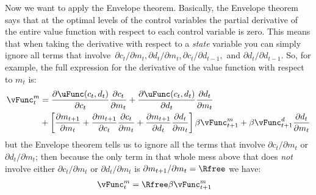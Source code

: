 \documentclass{handout}
\begin{document}
Now we want to apply the Envelope theorem.  Basically, the Envelope 
theorem says that at the optimal levels of the control variables the 
partial derivative of the entire value function with respect to each 
control variable is zero.  This means that when taking the derivative 
with respect to a {\it state} variable you can simply ignore all terms 
that involve~$\partial c_{t}/ \partial {m}_{t}, \partial d_{t} / 
\partial {m}_{t}, \partial c_{t} / \partial d_{t-1}, $ and $\partial 
d_{t} / \partial d_{t-1}.$ So, for example, the full expression for 
the derivative of the value function with respect to ${m}_{t}$ is:
\begin{equation}\begin{gathered}\begin{aligned}
        \vFunc_{t}^{{m}} & =  \frac{\partial \uFunc(c_{t},d_{t})}{\partial c_{t}}
                        \frac{\partial c_{t}}{\partial {m}_{t}}
                  + \frac{\partial \uFunc(c_{t},d_{t})}{\partial d_{t}}
                        \frac{\partial d_{t}}{\partial {m}_{t}} \nonumber \\
              &  + \left[\frac{\partial {m}_{t+1}}{\partial {m}_{t}}
                  +       \frac{\partial {m}_{t+1}}{\partial c_{t}}
                              \frac{\partial c_{t}}{\partial {m}_{t}}
                  +       \frac{\partial {m}_{t+1}}{\partial d_{t}}
                              \frac{\partial d_{t}}{\partial {m}_{t}} 
                        \right] \beta \vFunc^{{m}}_{t+1} + \beta 
                              \vFunc^{d}_{t+1} \frac{\partial d_{t}}{\partial 
                              {m}_{t}} \label{eq:vmt}
\end{aligned}\end{gathered}\end{equation}
but the Envelope theorem tells us to ignore all the terms that involve 
$\partial c_{t}/\partial {m}_{t}$ or $\partial d_{t}/\partial {m}_{t}$; 
then because the only term in that whole mess above that does {\it 
not} involve either $\partial c_{t}/\partial {m}_{t}$ or $\partial 
d_{t}/\partial {m}_{t}$ is $\partial {m}_{t+1}/\partial {m}_{t} = \Rfree$ we 
have:
\begin{equation}\begin{gathered}\begin{aligned}
        \vFunc_{t}^{{m}} & =  \Rfree \beta \vFunc_{t+1}^{{m}}  \label{eq:vxtEqvxtp1}
\end{aligned}\end{gathered}\end{equation}
\end{document}
